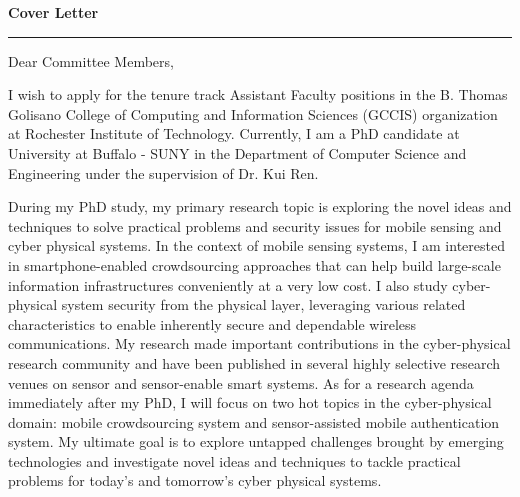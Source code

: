 \documentclass[11pt]{letter} %
\begin{document}

\begin{letter}{} 



\begin{center}
\Large\bf Cover Letter %
\vspace{20pt} \hrule height 1pt %
\end{center} 

\signature{Si Chen\\
Department of Computer Science and Engineering\\
University at Buffalo - SUNY\\
301 Davis Hall, Buffalo NY\\
(716) 335-8052} %


\opening{Dear Committee Members,} 
 
I wish to apply for the tenure track Assistant Faculty positions in the B. Thomas Golisano College of Computing and Information Sciences (GCCIS) organization at Rochester Institute of Technology. Currently, I am a PhD candidate at University at Buffalo - SUNY in the Department of Computer Science and Engineering under the supervision of Dr. Kui Ren. 

During my PhD study, my primary research topic is exploring the novel ideas and techniques to solve practical problems and security issues for mobile sensing and cyber physical systems. In the context of mobile sensing systems, I am interested in smartphone-enabled crowdsourcing approaches that can help build large-scale information infrastructures conveniently at a very low cost. I also study cyber-physical system security from the physical layer, leveraging various related characteristics to enable inherently secure and dependable wireless communications. My research made important contributions in the cyber-physical research community and have been published in several highly selective research venues on sensor and sensor-enable smart systems. As for a research agenda immediately after my PhD, I will focus on two hot topics in the cyber-physical domain: mobile crowdsourcing system and sensor-assisted mobile authentication system. My ultimate goal is to explore untapped challenges brought by emerging technologies and investigate novel ideas and techniques to tackle practical problems for today's and tomorrow's cyber physical systems.


\end{letter}
\end{document}
